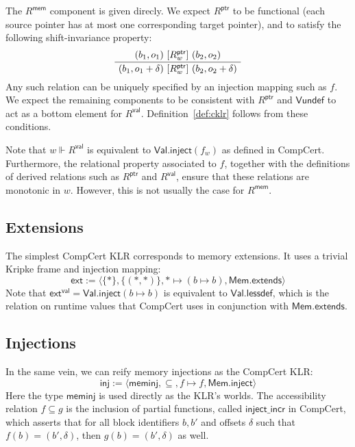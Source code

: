 \documentclass[sigplan,10pt,review,anonymous]{acmart}
\newcommand{\kw}[1]{\ensuremath{ \mathsf{#1} }}
\newcommand{\ifr}[1]{\ [{#1}]\ }
\begin{document}
The $R^\kw{mem}$ component is given direcly.
We expect $R^\kw{ptr}$ to be functional
(each source pointer has at most one corresponding target pointer),
and to satisfy the following shift-invariance property:
\[
  \AxiomC{$(b_1, o_1) \ifr{R^\kw{ptr}_w} (b_2, o_2)$}
  \UnaryInfC{$(b_1, o_1 + \delta) \ifr{R^\kw{ptr}_w} (b_2, o_2 + \delta)$}
  \DisplayProof
\]
Any such relation can be uniquely specified by
an injection mapping such as $f$.
We expect the remaining components to be consistent with $R^\kw{ptr}$
and $\kw{Vundef}$ to act as a bottom element for $R^\kw{val}$.
Definition~\ref{def:cklr} follows from these conditions.

Note that $w \Vdash R^\kw{val}$
is equivalent to $\kw{Val.inject}(f_w)$
as defined in CompCert.
Furthermore, the relational property associated to $f$,
together with the definitions of
derived relations such as $R^\kw{ptr}$ and $R^\kw{val}$,
ensure that these relations are monotonic in $w$.
However,
this is not usually the case for $R^\kw{mem}$.


\subsection{Extensions} %

The simplest CompCert KLR corresponds to memory extensions.
It uses a trivial Kripke frame and injection mapping:
\[
  \kw{ext} :=
    \langle \{*\}, \{(*,*)\}, * \mapsto (b \mapsto b), \kw{Mem.extends} \rangle
\]
Note that $\kw{ext}^\kw{val} = \kw{Val.inject}(b \mapsto b)$
is equivalent to $\kw{Val.lessdef}$,
which is the relation on runtime values that
CompCert uses in conjunction with \kw{Mem.extends}.


\subsection{Injections} %

In the same vein,
we can reify memory injections as the CompCert KLR:
\[
  \kw{inj} :=
    \langle
      \kw{meminj},
      {\subseteq}, %
      f \mapsto f,
      \kw{Mem.inject}
    \rangle
\]
Here the type \kw{meminj} is used directly
as the KLR's worlds.
The accessibility relation $f \subseteq g$
is the inclusion of partial functions,
called $\kw{inject\_incr}$ in CompCert,
which asserts that for all block identifiers $b, b'$ and offsets $\delta$
such that $f(b) = (b', \delta)$,
then $g(b) = (b', \delta)$ as well.
\end{document}

